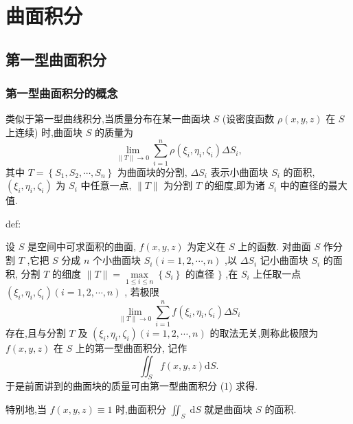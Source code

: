 \chapter{曲面积分}

\section{第一型曲面积分}

\subsection{第一型曲面积分的概念}

类似于第一型曲线积分,当质量分布在某一曲面块 \(S\) (设密度函数 \(\rho \left( {x,y,z}\right)\) 在 \(S\) 上连续) 时,曲面块 \(S\) 的质量为
\[
\mathop{\lim }\limits_{{\parallel T\parallel  \rightarrow  0}}\mathop{\sum }\limits_{{i = 1}}^{n}\rho \left( {{\xi }_{i},{\eta }_{i},{\zeta }_{i}}\right) \Delta {S}_{i},
\]
其中 \(T = \left\{  {{S}_{1},{S}_{2},\cdots ,{S}_{n}}\right\}\) 为曲面块的分割, \(\Delta {S}_{i}\) 表示小曲面块 \({S}_{i}\) 的面积, \(\left( {{\xi }_{i},{\eta }_{i},{\zeta }_{i}}\right)\) 为 \({S}_{i}\) 中任意一点, \(\parallel T\parallel\) 为分割 \(T\) 的细度,即为诸 \({S}_{i}\) 中的直径的最大值.

\begin{definition}{}{def:}

\end{definition}
设 \(S\) 是空间中可求面积的曲面, \(f\left( {x,y,z}\right)\) 为定义在 \(S\) 上的函数. 对曲面 \(S\) 作分割 \(T\) ,它把 \(S\) 分成 \(n\) 个小曲面块 \({S}_{i}\left( {i = 1,2,\cdots ,n}\right)\) ,以 \(\Delta {S}_{i}\) 记小曲面块 \({S}_{i}\) 的面积, 分割 \(T\) 的细度 \(\parallel T\parallel  = \mathop{\max }\limits_{{1 \leq  i \leq  n}}\left\{  {S}_{i}\right\}\) 的直径 \(\}\) ,在 \({S}_{i}\) 上任取一点 \(\left( {{\xi }_{i},{\eta }_{i},{\zeta }_{i}}\right) \left( {i = 1,2,\cdots ,n}\right)\) , 若极限
\[
\mathop{\lim }\limits_{{\parallel T\parallel  \rightarrow  0}}\mathop{\sum }\limits_{{i = 1}}^{n}f\left( {{\xi }_{i},{\eta }_{i},{\zeta }_{i}}\right) \Delta {S}_{i}
\]
存在,且与分割 \(T\) 及 \(\left( {{\xi }_{i},{\eta }_{i},{\zeta }_{i}}\right) \left( {i = 1,2,\cdots ,n}\right)\) 的取法无关,则称此极限为 \(f\left( {x,y,z}\right)\) 在 \(S\) 上的第一型曲面积分, 记作
\[
{\iint }_{S}f\left( {x,y,z}\right) \mathrm{d}S. \tag{1}
\]
于是前面讲到的曲面块的质量可由第一型曲面积分 (1) 求得.

特别地,当 \(f\left( {x,y,z}\right)  \equiv  1\) 时,曲面积分 \({\iint }_{S}\mathrm{\;d}S\) 就是曲面块 \(S\) 的面积.

